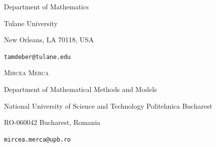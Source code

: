 \documentclass{article}
\begin{document}
\vspace{0.1in}

Department of Mathematics 

Tulane University

New Orleans, LA 70118, USA 

\vspace{0.05in}

{\tt tamdeber@tulane.edu}

 \vspace{0.3in}

{\textsc{Mircea Merca}} 

\vspace{0.1in}

Department of Mathematical Methods and Models

National University of Science and Technology Politehnica Bucharest

RO-060042 Bucharest, Romania

\vspace{0.05in}

{\tt mircea.merca@upb.ro}
\end{document}
